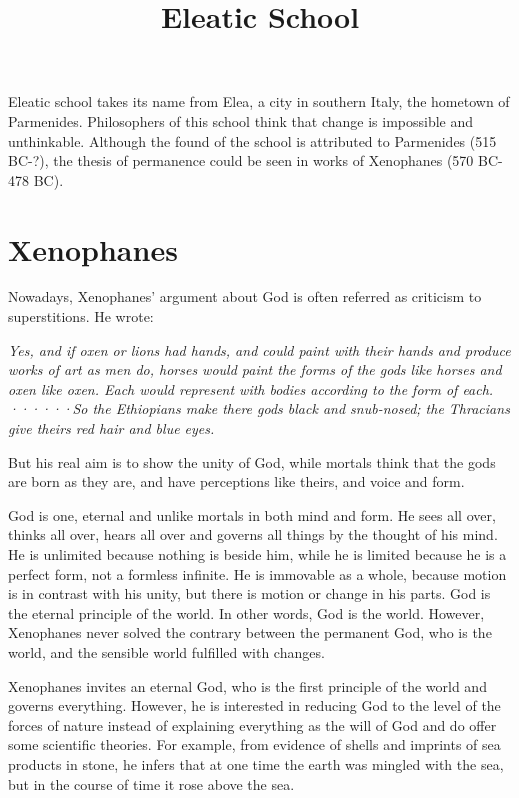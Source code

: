 \documentclass[11pt]{article}
\title{Eleatic School}
\date{}
\begin{document}
  \maketitle
  
  \newpage

  \linenumbers

Eleatic school takes its name from Elea, a city in southern Italy, the hometown of Parmenides. 
Philosophers of this school think that change is impossible and unthinkable. 
Although the found of the school is attributed to Parmenides (515 BC-?), the thesis of permanence could be seen in works of Xenophanes (570 BC-478 BC).

\section{Xenophanes}
Nowadays, Xenophanes’ argument about God is often referred as criticism to superstitions. 
He wrote: 

\textit{Yes, and if oxen or lions had hands, and could paint with their hands and produce works of art as men do, horses would paint the forms of the gods like horses and oxen like oxen. Each would represent with bodies according to the form of each. ······So the Ethiopians make there gods black and snub-nosed; the Thracians give theirs red hair and blue eyes.}

But his real aim is to show the unity of God, while mortals think that the gods are born as they are, and have perceptions like theirs, and voice and form. 

\newline

God is one, eternal and unlike mortals in both mind and form. 
He sees all over, thinks all over, hears all over and governs all things by the thought of his mind. 
He is unlimited because nothing is beside him, while he is limited because he is a perfect form, not a formless infinite. 
He is immovable as a whole, because motion is in contrast with his unity, but there is motion or change in his parts. 
God is the eternal principle of the world. 
In other words, God is the world. 
However, Xenophanes never solved the contrary between the permanent God, who is the world, and the sensible world fulfilled with changes.

\newline

Xenophanes invites an eternal God, who is the first principle of the world and governs everything. 
However, he is interested in reducing God to the level of the forces of nature instead of explaining everything as the will of God and do offer some scientific theories. 
For example, from evidence of shells and imprints of sea products in stone, he infers that at one time the earth was mingled with the sea, but in the course of time it rose above the sea.
  
\end{document}
